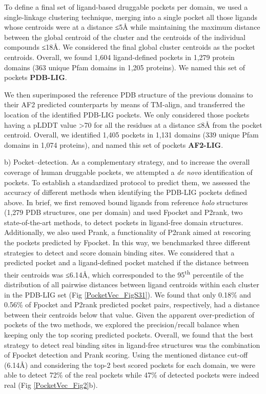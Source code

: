 To define a final set of ligand-based druggable pockets per domain, we used a single-linkage clustering technique, merging into a single pocket all those ligands whose centroids were at a distance ≤5Å while maintaining the maximum distance between the global centroid of the cluster and the centroids of the individual compounds ≤18Å. We considered the final global cluster centroids as the pocket centroids. Overall, we found 1,604 ligand-defined pockets in 1,279 protein domains (363 unique Pfam domains in 1,205 proteins). We named this set of pockets \textbf{PDB-LIG}.

We then superimposed the reference PDB structure of the previous domains to their AF2 predicted counterparts by means of TM-align\cite{zhang_tm-align_2005}, and transferred the location of the identified PDB-LIG pockets. We only considered those pockets having a pLDDT value >70 for all the residues at a distance ≤8Å from the pocket centroid. Overall, we identified 1,405 pockets in 1,131 domains (339 unique Pfam domains in 1,074 proteins), and named this set of pockets \textbf{AF2-LIG}.

b) Pocket--detection. As a complementary strategy, and to increase the overall coverage of human druggable pockets, we attempted a \textit{de novo} identification of pockets. To establish a standardized protocol to predict them, we assessed the accuracy of different methods when identifying the PDB-LIG pockets defined above. In brief, we first removed bound ligands from reference \textit{holo} structures (1,279 PDB structures, one per domain) and used Fpocket\cite{le_guilloux_fpocket_2009} and P2rank\cite{krivak_p2rank_2018}, two state-of-the-art methods, to detect pockets in ligand-free domain structures. Additionally, we also used Prank\cite{krivak_improving_2015}, a functionality of P2rank aimed at rescoring the pockets predicted by Fpocket. In this way, we benchmarked three different strategies to detect and score domain binding sites. We considered that a predicted pocket and a ligand-defined pocket matched if the distance between their centroids was ≤6.14Å, which corresponded to the 95\textsuperscript{th} percentile of the distribution of all pairwise distances between ligand centroids within each cluster in the PDB-LIG set (Fig \ref{PocketVec_FigS31}). We found that only 0.18\% and 0.56\% of Fpocket and P2rank predicted pocket pairs, respectively, had a distance between their centroids below that value. Given the apparent over-prediction of pockets of the two methods, we explored the precision/recall balance when keeping only the top scoring predicted pockets. Overall, we found that the best strategy to detect real binding sites in ligand-free structures was the combination of Fpocket detection and Prank scoring. Using the mentioned distance cut-off (6.14Å) and considering the top-2 best scored pockets for each domain, we were able to detect 72\% of the real pockets while 47\% of detected pockets were indeed real (Fig \ref{PocketVec_Fig2}b).

